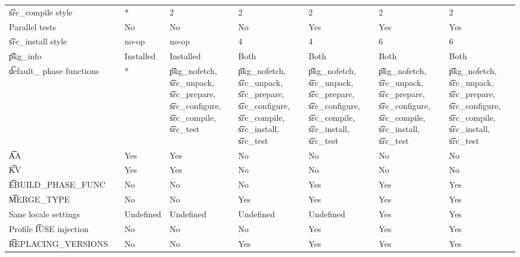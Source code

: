 \begin{landscape}
\begin{longtable}{llP{7.5em}P{7.5em}P{7.5em}P{7.5em}P{7.5em}P{7.5em}}
\t{src_compile} style &  &
    * & 2 & 2 & 2 & 2 & 2 \\

Parallel tests &  &
    No & No & No & Yes & Yes & Yes \\

\t{src_install} style &  &
    no-op & no-op & 4 & 4 & 6 & 6 \\

\t{pkg_info} &  &
    Installed & Installed & Both & Both & Both & Both \\

\t{default_} phase functions &  &
    * &
    \t{pkg_nofetch}, \t{src_unpack}, \t{src_prepare}, \t{src_configure},
        \t{src_compile}, \t{src_test} &
    \t{pkg_nofetch}, \t{src_unpack}, \t{src_prepare}, \t{src_configure},
        \t{src_compile}, \t{src_install}, \t{src_test} &
    \t{pkg_nofetch}, \t{src_unpack}, \t{src_prepare}, \t{src_configure},
        \t{src_compile}, \t{src_install}, \t{src_test} &
    \t{pkg_nofetch}, \t{src_unpack}, \t{src_prepare}, \t{src_configure},
        \t{src_compile}, \t{src_install}, \t{src_test} &
    \t{pkg_nofetch}, \t{src_unpack}, \t{src_prepare}, \t{src_configure},
        \t{src_compile}, \t{src_install}, \t{src_test} \\

\t{AA} &  &
    Yes & Yes & No & No & No & No \\

\t{KV} &  &
    Yes & Yes & No & No & No & No \\

\t{EBUILD_PHASE_FUNC} &  &
    No & No & No & Yes & Yes & Yes \\

\t{MERGE_TYPE} &  &
    No & No & Yes & Yes & Yes & Yes \\

Sane locale settings &  &
    Undefined & Undefined & Undefined & Undefined & Yes & Yes \\

Profile \t{IUSE} injection &  &
    No & No & No & Yes & Yes & Yes \\

\t{REPLACING_VERSIONS} &  &
    No & No & Yes & Yes & Yes & Yes \\


\end{longtable}
\end{landscape}
